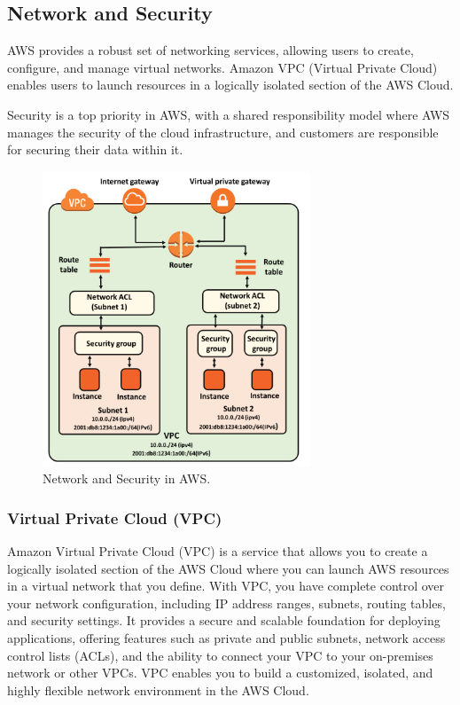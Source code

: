 \documentclass{article}
\begin{document}
\subsection{Network and Security}
AWS provides a robust set of networking services, allowing users to create, configure, and manage virtual networks. Amazon VPC (Virtual Private Cloud) enables users to launch resources in a logically isolated section of the AWS Cloud.\par
Security is a top priority in AWS, with a shared responsibility model where AWS manages the security of the cloud infrastructure, and customers are responsible for securing their data within it.\par
\begin{figure}[!htp]
    \centering
    \includegraphics[width=8cm]{Pictures/Theory/Network and Security.png}
    \caption{Network and Security in AWS.}
    \label{fig:enter-label}
\end{figure}
\newpage
\subsubsection{Virtual Private Cloud (VPC)}
Amazon Virtual Private Cloud (VPC) is a service that allows you to create a logically isolated section of the AWS Cloud where you can launch AWS resources in a virtual network that you define. With VPC, you have complete control over your network configuration, including IP address ranges, subnets, routing tables, and security settings. It provides a secure and scalable foundation for deploying applications, offering features such as private and public subnets, network access control lists (ACLs), and the ability to connect your VPC to your on-premises network or other VPCs. VPC enables you to build a customized, isolated, and highly flexible network environment in the AWS Cloud.\par
\end{document}
